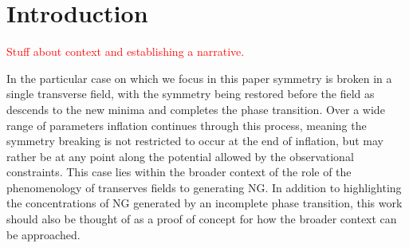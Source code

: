 
\section{Introduction} \label{sec:intro}



\textcolor{red}{Stuff about context and establishing a narrative.}

In the particular case on which we focus in this paper symmetry is broken in a single transverse field, with the symmetry being restored before the field as descends to the new minima and completes the phase transition. Over a wide range of parameters inflation continues through this process, meaning the symmetry breaking is not restricted to occur at the end of inflation, but may rather be at any point along the potential allowed by the observational constraints. This case lies within the broader context of the role of the phenomenology of transerves fields to generating NG. In addition to highlighting the concentrations of NG generated by an incomplete phase transition, this work should also be thought of as a proof of concept for how the broader context can be approached.   

